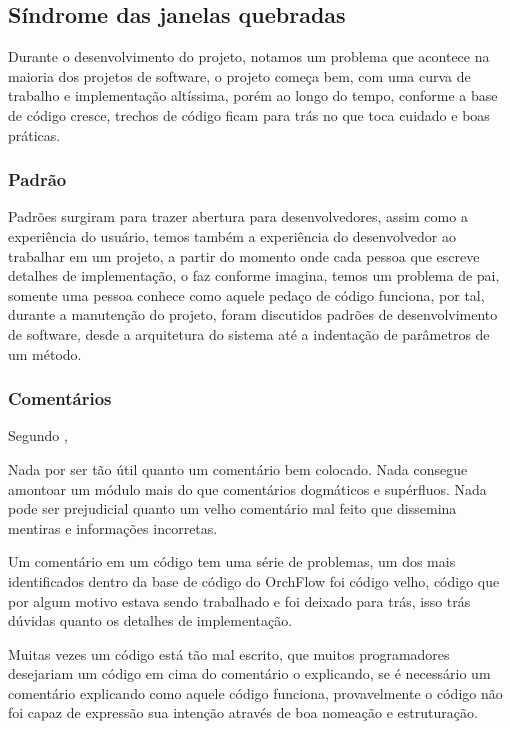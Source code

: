 \documentclass[
	article,			%
	11pt,				%
	oneside,			%
	a4paper,			%
	english,			%
	brazil,				%
	sumario=tradicional
	]{abntex2}
\begin{document}
\subsection{Síndrome das janelas quebradas}

Durante o desenvolvimento do projeto, notamos um problema que acontece na maioria dos projetos de software, o projeto começa bem, com uma curva de trabalho e implementação altíssima, porém ao longo do tempo, conforme a base de código cresce, trechos de código ficam para trás no que toca cuidado e boas práticas.

\subsubsection{Padrão}

Padrões surgiram para trazer abertura para desenvolvedores, assim como a experiência do usuário, temos também a experiência do desenvolvedor ao trabalhar em um projeto, a partir do momento onde cada pessoa que escreve detalhes de implementação, o faz conforme imagina, temos um problema de pai, somente uma pessoa conhece como aquele pedaço de código funciona, por tal, durante a manutenção do projeto, foram discutidos padrões de desenvolvimento de software, desde a arquitetura do sistema até a indentação de parâmetros de um método.

\subsubsection{Comentários}

Segundo ,

\begin{quoting}[rightmargin=0cm,leftmargin=4cm]
	{\footnotesize \noindent Nada por ser tão útil quanto um comentário bem colocado. Nada consegue amontoar um módulo mais do que comentários dogmáticos e supérfluos. Nada pode ser prejudicial quanto um velho comentário mal feito que dissemina mentiras e informações incorretas. }
\end{quoting}

Um comentário em um código tem uma série de problemas, um dos mais identificados dentro da base de código do OrchFlow foi código velho, código que por algum motivo estava sendo trabalhado e foi deixado para trás, isso trás dúvidas quanto os detalhes de implementação.

Muitas vezes um código está tão mal escrito, que muitos programadores desejariam um código em cima do comentário o explicando, se é necessário um comentário explicando como aquele código funciona, provavelmente o código não foi capaz de expressão sua intenção através de boa nomeação e estruturação.
\end{document}
